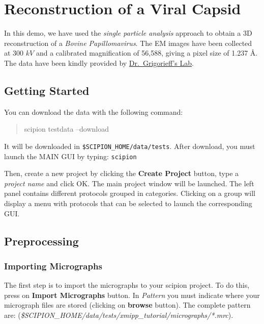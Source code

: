 \documentclass[12pt]{article} %
\newenvironment{command}{\tt\begin{quote}}{\end{quote}}
\newcommand{\comm}[1]{\texttt{#1}}
\begin{document}
\section{Reconstruction of a Viral Capsid}

In this demo, we have used the \emph{single particle analysis} approach to obtain
a 3D reconstruction of a \emph{Bovine Papillomavirus}. The EM images have been
collected at 300 $kV$ and a calibrated magnification of 56,588,  %
giving a pixel
size of 1.237 \AA  \citep{Wolf2010}. The data have been kindly
provided by \href{http://grigoriefflab.janelia.org/}{Dr.~Grigorieff’s Lab}.

\subsection{Getting Started}

You can download the data with the following command:

\begin{command}
scipion testdata --download
\end{command}


It will be downloaded in \verb+$SCIPION_HOME/data/tests+. After download, you must
launch the MAIN GUI by typing: \comm{scipion}


Then, create a new project by clicking the \textbf{Create Project} button, type a
\textit{project name} and click OK. The main project window will be launched.
The left panel contains different protocols grouped in categories. Clicking on
a group will display a menu with protocols that can be selected to launch the
corresponding GUI.

\subsection{Preprocessing}

\subsubsection{Importing Micrographs}

The first step is to import the micrographs to your scipion project. To do this,
press on \textbf{Import Micrographs} button. In \textit{Pattern}  you must indicate
where your micrograph files are stored (clicking on \textbf{browse} button). The
complete pattern are:
(\emph {\$SCIPION\_HOME/data/tests/xmipp\_tutorial/micrographs/*.mrc}).
\end{document}
